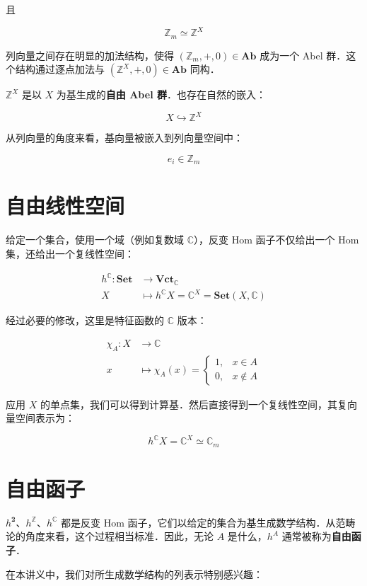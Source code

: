 \documentclass[10pt, openany]{book}
\begin{document}
且

$$
\mathbb Z_m \simeq \mathbb Z^X
$$

列向量之间存在明显的加法结构，使得 $(\mathbb Z_m,+,0) \in \textbf{Ab}$ 成为一个 Abel 群．这个结构通过逐点加法与 $(\mathbb Z^X,+,0) \in \textbf{Ab}$ 同构．

$\mathbb Z^X$ 是以 $X$ 为基生成的\textbf{自由 Abel 群}．也存在自然的嵌入：

$$
X \hookrightarrow \mathbb Z^X
$$

从列向量的角度来看，基向量被嵌入到列向量空间中：

$$
e_i \in \mathbb Z_m
$$

\section{自由线性空间}

给定一个集合，使用一个域（例如复数域 $\mathbb C$），反变 Hom 函子不仅给出一个 Hom 集，还给出一个复线性空间：

$$
\begin{aligned}
h^{\mathbb C}: \textbf{Set} &\to \textbf{Vct}_{\mathbb C} \\
X &\mapsto h^{\mathbb C} X = \mathbb C^X = \textbf{Set}(X,\mathbb C)
\end{aligned}
$$

经过必要的修改，这里是特征函数的 $\mathbb C$ 版本：

$$
\begin{aligned}
\chi_A: X &\to \mathbb C \\
x &\mapsto \chi_A(x) = \begin{cases} 1, & x \in A \\ 0, & x \notin A \end{cases}
\end{aligned}
$$

应用 $X$ 的单点集，我们可以得到计算基．然后直接得到一个复线性空间，其复向量空间表示为：

$$
h^{\mathbb C} X = \mathbb C^X \simeq \mathbb C_m
$$

\section{自由函子}

$h^{\mathbf{2}}$、$h^{\mathbb Z}$、$h^{\mathbb C}$ 都是反变 Hom 函子，它们以给定的集合为基生成数学结构．从范畴论的角度来看，这个过程相当标准．因此，无论 $A$ 是什么，$h^A$ 通常被称为\textbf{自由函子}．

在本讲义中，我们对所生成数学结构的列表示特别感兴趣：
\end{document}
